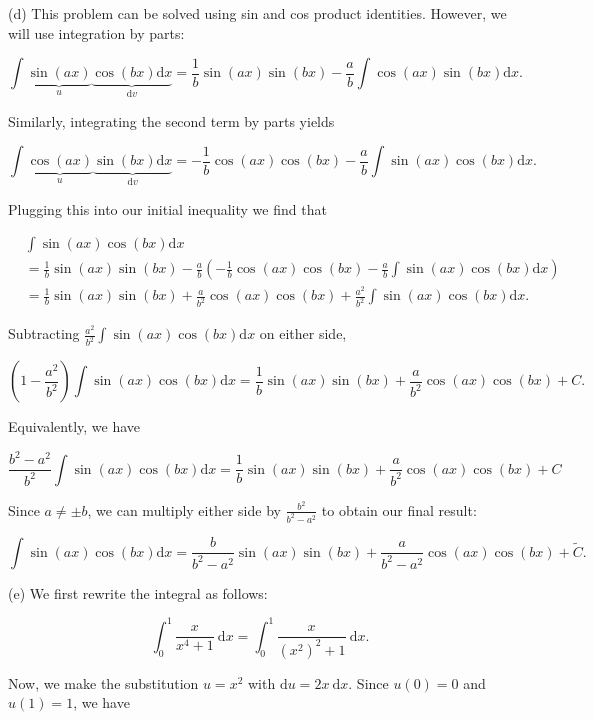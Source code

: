 \documentclass[10pt]{article}
\begin{document}
(d) This problem can be solved using sin and cos product identities. However, we will use integration by parts:

$$
\int \underbrace{\sin (a x)}_{u} \underbrace{\cos (b x) \mathrm{d} x}_{\mathrm{d} v}=\frac{1}{b} \sin (a x) \sin (b x)-\frac{a}{b} \int \cos (a x) \sin (b x) \mathrm{d} x .
$$

Similarly, integrating the second term by parts yields

$$
\int \underbrace{\cos (a x)}_{u} \underbrace{\sin (b x) \mathrm{d} x}_{\mathrm{d} v}=-\frac{1}{b} \cos (a x) \cos (b x)-\frac{a}{b} \int \sin (a x) \cos (b x) \mathrm{d} x .
$$

Plugging this into our initial inequality we find that

$$
\begin{aligned}
& \int \sin (a x) \cos (b x) \mathrm{d} x \\
& =\frac{1}{b} \sin (a x) \sin (b x)-\frac{a}{b}\left(-\frac{1}{b} \cos (a x) \cos (b x)-\frac{a}{b} \int \sin (a x) \cos (b x) \mathrm{d} x\right) \\
& =\frac{1}{b} \sin (a x) \sin (b x)+\frac{a}{b^{2}} \cos (a x) \cos (b x)+\frac{a^{2}}{b^{2}} \int \sin (a x) \cos (b x) \mathrm{d} x .
\end{aligned}
$$

Subtracting $\frac{a^{2}}{b^{2}} \int \sin (a x) \cos (b x) \mathrm{d} x$ on either side,

$$
\left(1-\frac{a^{2}}{b^{2}}\right) \int \sin (a x) \cos (b x) \mathrm{d} x=\frac{1}{b} \sin (a x) \sin (b x)+\frac{a}{b^{2}} \cos (a x) \cos (b x)+C .
$$

Equivalently, we have

$$
\frac{b^{2}-a^{2}}{b^{2}} \int \sin (a x) \cos (b x) \mathrm{d} x=\frac{1}{b} \sin (a x) \sin (b x)+\frac{a}{b^{2}} \cos (a x) \cos (b x)+C
$$

Since $a \neq \pm b$, we can multiply either side by $\frac{b^{2}}{b^{2}-a^{2}}$ to obtain our final result:

$$
\int \sin (a x) \cos (b x) \mathrm{d} x=\frac{b}{b^{2}-a^{2}} \sin (a x) \sin (b x)+\frac{a}{b^{2}-a^{2}} \cos (a x) \cos (b x)+\widetilde{C} .
$$

(e) We first rewrite the integral as follows:

$$
\int_{0}^{1} \frac{x}{x^{4}+1} \mathrm{~d} x=\int_{0}^{1} \frac{x}{\left(x^{2}\right)^{2}+1} \mathrm{~d} x .
$$

Now, we make the substitution $u=x^{2}$ with $\mathrm{d} u=2 x \mathrm{~d} x$. Since $u(0)=0$ and $u(1)=1$, we have
\end{document}
